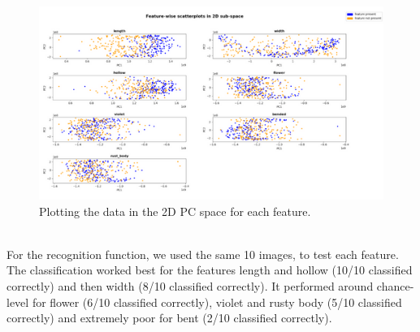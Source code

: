 \begin{figure}[H]
	\centering
	\includegraphics[scale=0.8]{Figures/chapter04/pc_2dspace}
	\decoRule
	\caption[Featurewise scatterplot in 2D]{Plotting the data in the 2D PC space for each feature.}
	\label{fig:PrincipalComponentScatter}
\end{figure}
\\
For the recognition function, we used the same 10 images, to test each feature. The classification worked best for the features length and hollow (10/10 classified correctly) and then width (8/10 classified correctly). It performed around chance-level for flower (6/10 classified correctly), violet and rusty body (5/10 classified correctly) and extremely poor for bent (2/10 classified correctly).   \\
\\
 
